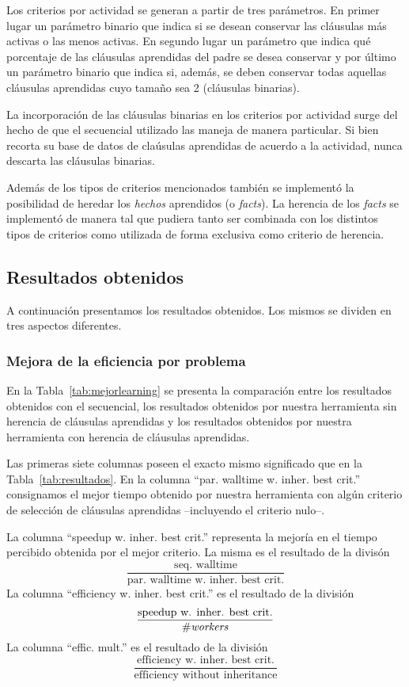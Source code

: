 Los criterios por actividad se generan a partir de tres parámetros. En primer
lugar un parámetro binario que indica si se desean conservar las cláusulas más
activas o las menos activas. En segundo lugar un parámetro que indica qué
porcentaje de las cláusulas aprendidas del padre se desea conservar y por
último un parámetro binario que indica si, además, se deben conservar todas
aquellas cláusulas aprendidas cuyo tamaño sea 2 (cláusulas binarias).

La incorporación de las cláusulas binarias en los criterios por actividad
surge del hecho de que el \ssolver secuencial utilizado las maneja de manera
particular. Si bien recorta su base de datos de claúsulas aprendidas de
acuerdo a la actividad, nunca descarta las cláusulas binarias.

Además de los tipos de criterios mencionados también se implementó la
posibilidad de heredar los \emph{hechos} aprendidos (o \emph{facts}). La
herencia de los \emph{facts} se implementó de manera tal que pudiera tanto ser
combinada con los distintos tipos de criterios como utilizada de forma
exclusiva como criterio de herencia.




\subsection{Resultados obtenidos}

A continuación presentamos los resultados obtenidos. Los mismos se dividen en
tres aspectos diferentes. 

\subsubsection{Mejora de la eficiencia por problema}

En la Tabla~\ref{tab:mejorlearning} se presenta la comparación entre los
resultados obtenidos con el \ssolver secuencial, los resultados obtenidos por
nuestra herramienta sin herencia de cláusulas aprendidas y los resultados
obtenidos por nuestra herramienta con herencia de cláusulas aprendidas.

Las primeras siete columnas poseen el exacto mismo significado que en la
Tabla~\ref{tab:resultados}. En la columna ``par. walltime w. inher. best crit.'' consignamos
el mejor tiempo obtenido por nuestra herramienta con algún criterio de
selección de cláusulas aprendidas --incluyendo el criterio nulo--.

La columna ``speedup w. inher. best crit.'' representa la mejoría en el tiempo
percibido obtenida por el mejor criterio. La misma es el resultado de la
divisón $$\frac{\text{seq. walltime}}{\text{par. walltime w. inher. best
crit.}}$$ La columna ``efficiency w. inher. best crit.'' es el resultado de la
división $$\frac{\text{speedup w. inher. best crit.}}{\text{\#\emph{workers}}}$$ La
columna ``effic. mult.'' es el resultado de la división
$$\frac{\text{efficiency w. inher. best
crit.}}{\text{efficiency without inheritance}}$$

